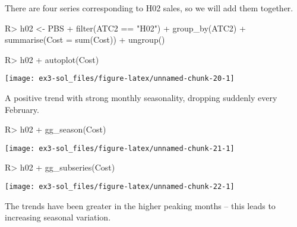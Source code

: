 \documentclass[
]{article}
\begin{document}
There are four series corresponding to H02 sales, so we will add them together.

\begin{CodeChunk}
\begin{CodeInput}
R> h02 <- PBS %
+   filter(ATC2 == "H02") %
+   group_by(ATC2) %
+   summarise(Cost = sum(Cost)) %
+   ungroup()
\end{CodeInput}
\end{CodeChunk}

\begin{CodeChunk}
\begin{CodeInput}
R> h02 %
+   autoplot(Cost)
\end{CodeInput}


\begin{center}\texttt{[image: ex3-sol\_files/figure-latex/unnamed-chunk-20-1]} \end{center}

\end{CodeChunk}

A positive trend with strong monthly seasonality, dropping suddenly every February.

\begin{CodeChunk}
\begin{CodeInput}
R> h02 %
+   gg_season(Cost)
\end{CodeInput}


\begin{center}\texttt{[image: ex3-sol\_files/figure-latex/unnamed-chunk-21-1]} \end{center}

\end{CodeChunk}

\begin{CodeChunk}
\begin{CodeInput}
R> h02 %
+   gg_subseries(Cost)
\end{CodeInput}


\begin{center}\texttt{[image: ex3-sol\_files/figure-latex/unnamed-chunk-22-1]} \end{center}

\end{CodeChunk}

The trends have been greater in the higher peaking months -- this leads to increasing seasonal variation.
\end{document}
